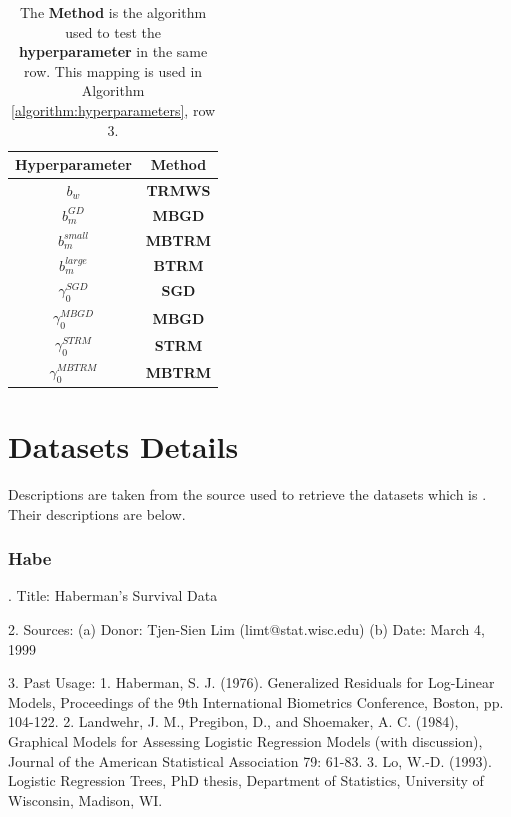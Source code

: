 \documentclass[letterpaper,12pt,titlepage,oneside,final]{book}
\begin{document}
	\begin{table}[h]
		\centering
		\begin{tabular}{ |c|c| }  
			\hline
			\textbf{Hyperparameter} & \textbf{Method}\\
			\hline
			$b_{w}$ & \textbf{TRMWS} \\
			\hline
			$b_{m}^{GD}$ & \textbf{MBGD} \\
			\hline
			$b_{m}^{small}$ & \textbf{MBTRM} \\
			\hline
			$b_{m}^{large}$ & \textbf{BTRM} \\
			\hline
			$\gamma^{SGD}_{0}$ & \textbf{SGD} \\ 
			\hline
			$\gamma^{MBGD}_{0}$ & \textbf{MBGD} \\ 
			\hline
			$\gamma^{STRM}_{0}$ & \textbf{STRM} \\ 
			\hline
			$\gamma^{MBTRM}_{0}$ & \textbf{MBTRM} \\ 
			\hline
		\end{tabular}
		\caption{ The \textbf{Method} is the  algorithm used to test the \textbf{hyperparameter} in the same row. This mapping is used in Algorithm \ref{algorithm:hyperparameters}, row 3.}
		\label{table:hyperparameters}
	\end{table}
	
	\chapter[]{Datasets Details} \label{appendix:dataset_descriptions}
	Descriptions are taken from the source used to retrieve the datasets which is \cite{ml_repo}. Their descriptions are below. 
	\subsection{Habe}
	. Title: Haberman's Survival Data
	
	2. Sources:
	(a) Donor:   Tjen-Sien Lim (limt@stat.wisc.edu)
	(b) Date:    March 4, 1999
	
	3. Past Usage:
	1. Haberman, S. J. (1976). Generalized Residuals for Log-Linear
	Models, Proceedings of the 9th International Biometrics
	Conference, Boston, pp. 104-122.
	2. Landwehr, J. M., Pregibon, D., and Shoemaker, A. C. (1984),
	Graphical Models for Assessing Logistic Regression Models (with
	discussion), Journal of the American Statistical Association 79:
	61-83.
	3. Lo, W.-D. (1993). Logistic Regression Trees, PhD thesis,
	Department of Statistics, University of Wisconsin, Madison, WI.
	
\end{document}
